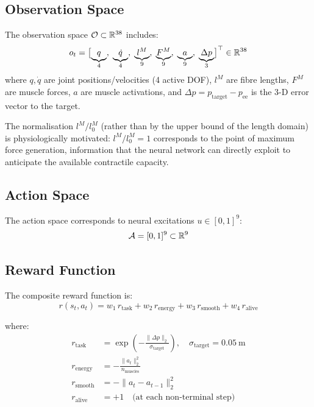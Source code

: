\subsection{Observation Space}

The observation space $\mathcal{O} \subset \mathbb{R}^{38}$ includes:
\begin{equation}
  o_t = \bigl[\underbrace{q}_{4},\;\underbrace{\dot{q}}_{4},\;
              \underbrace{l^M}_{9},\;\underbrace{F^M}_{9},\;
              \underbrace{a}_{9},\;
              \underbrace{\Delta p}_{3}\bigr]^\top \in \mathbb{R}^{38}
  \label{eq:obs}
\end{equation}
where $q, \dot{q}$ are joint positions/velocities (4 active DOF), $l^M$ are fibre
lengths, $F^M$ are muscle forces, $a$ are muscle activations, and
$\Delta p = p_\text{target} - p_\text{ee}$ is the 3-D error vector to the target.

\begin{remarque}
The normalisation $l^M/l_0^M$ (rather than by the upper bound of the length
domain) is physiologically motivated: $l^M/l_0^M = 1$ corresponds to the point of
maximum force generation, information that the neural network can directly exploit
to anticipate the available contractile capacity.
\end{remarque}

\subsection{Action Space}

The action space corresponds to neural excitations $u \in [0,1]^9$:
\begin{equation}
  \mathcal{A} = [0,1]^9 \subset \mathbb{R}^9
  \label{eq:action_space}
\end{equation}

\subsection{Reward Function}
\label{sec:reward}

The composite reward function is:
\begin{equation}
  r(s_t, a_t) = w_1\,r_\text{task} + w_2\,r_\text{energy}
              + w_3\,r_\text{smooth} + w_4\,r_\text{alive}
  \label{eq:reward}
\end{equation}

where:
\begin{align}
  r_\text{task}   &= \exp\!\left(-\frac{\|\Delta p\|_2}{\sigma_\text{target}}\right),
                     \quad \sigma_\text{target} = 0.05~\text{m}
                     \label{eq:r_task} \\[4pt]
  r_\text{energy} &= -\frac{\|a_t\|_2^2}{n_\text{muscles}}
                     \label{eq:r_energy} \\[4pt]
  r_\text{smooth} &= -\|a_t - a_{t-1}\|_2^2
                     \label{eq:r_smooth} \\[4pt]
  r_\text{alive}  &= +1 \quad \text{(at each non-terminal step)}
                     \label{eq:r_alive}
\end{align}

